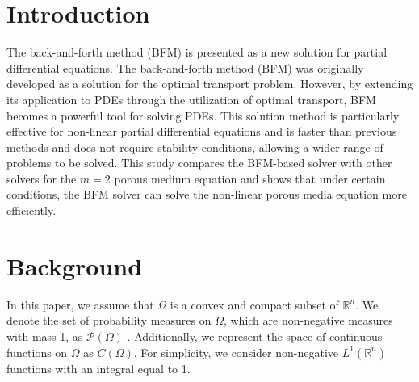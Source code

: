 \documentclass[a4,11pt, twocolumn, dvipdfmx]{article}
\theoremstyle{definition}
\begin{document}


\section{Introduction}
The back-and-forth method (BFM) is presented as a new solution for partial differential equations\cite{MR4238775}. 
The back-and-forth method (BFM) was originally developed as a solution for the optimal transport problem. 
However, by extending its application to PDEs through the utilization of optimal transport, 
BFM becomes a powerful tool for solving PDEs.
This solution method is particularly effective for non-linear partial differential equations and is faster than previous methods and does not require stability conditions, 
allowing a wider range of problems to be solved.
This study compares the BFM-based solver with other solvers for the $m=2$ porous medium equation and shows that under certain conditions, the BFM solver can solve the non-linear porous media equation more efficiently.
\section{Background}
In this paper, we assume that $\Omega$ is a convex and compact subset of $\mathbb{R}^n$. 
We denote the set of probability measures on $\Omega$, which are non-negative measures with mass 1, as $\mathcal{P} (\Omega)$ . 
Additionally, we represent the space of continuous functions on $\Omega$ as $C(\Omega)$. 
For simplicity, we consider non-negative \(L^1(\mathbb{R}^n)\) functions with an integral equal to 1.
\end{document}
